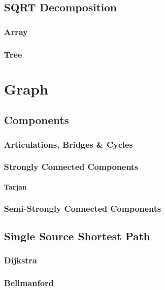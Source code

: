 \documentclass[10pt,a4paper]{report}
\begin{document}
	\section{SQRT Decomposition}
		\subsection{Array}
			
		\newpage
		\subsection{Tree}
			
	
\chapter{Graph}
	\section{Components}
		\subsection{Articulations, Bridges \& Cycles}
		\newpage
		\subsection{Strongly Connected Components}
			\subsubsection{Tarjan}
				
		\subsection{Semi-Strongly Connected Components}
	\section{Single Source Shortest Path}
		\subsection{Dijkstra}
		\newpage
		\subsection{Bellmanford}
			
		
\end{document}

